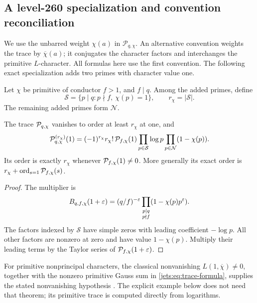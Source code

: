 \subsection{A level-260 specialization and convention reconciliation}
We use the unbarred weight $\chi(a)$ in $\mathcal P_{q,\chi}$.
An alternative convention weights the trace by $\overline\chi(a)$; it
conjugates the character factors and interchanges the primitive $L$-character.
All formulas here use the first convention. The following exact specialization
adds two primes with character value one.



Let $\chi$ be primitive of conductor $f>1$, and $f\mid q$.
Among the added primes, define
\[
\mathcal S=\{p\mid q:p\nmid f,\ \chi(p)=1\},\qquad r_\chi=|\mathcal S|.
\]
The remaining added primes form $\mathcal N$.

\begin{theorem}\label{conductor:thm:twisted}
The trace $\mathcal P_{q,\chi}$ vanishes to order at least $r_\chi$ at one, and
\begin{equation}\label{conductor:eq:twistedlead}
\mathcal P_{q,\chi}^{(r_\chi)}(1)=
(-1)^{r_\chi}r_\chi!\,
\mathcal P_{f,\chi}(1)
\prod_{p\in\mathcal S}\log p
\prod_{p\in\mathcal N}(1-\chi(p)).
\end{equation}
Its order is exactly $r_\chi$ whenever $\mathcal P_{f,\chi}(1)\ne0$.
More generally its exact order is $r_\chi+\operatorname{ord}_{s=1}\mathcal P_{f,\chi}(s)$.
\end{theorem}
\begin{proof}
The multiplier is
\[
B_{q,f,\chi}(1+\varepsilon)=
(q/f)^{-\varepsilon}
\prod_{\substack{p\mid q\\p\nmid f}}(1-\chi(p)p^\varepsilon).
\]
The factors indexed by $\mathcal S$ have simple zeros with leading
coefficient $-\log p$. All other factors are nonzero at zero and have
value $1-\chi(p)$. Multiply their leading terms by the Taylor series
of $\mathcal P_{f,\chi}(1+\varepsilon)$.
\end{proof}

For primitive nonprincipal characters, the classical nonvanishing
$L(1,\overline\chi)\ne0$, together with the nonzero primitive Gauss sum in
\eqref{jets:eq:trace-formula}, supplies the stated nonvanishing hypothesis
\cite{jets:dlmf-dirichlet}. The explicit example below does not need that theorem;
its primitive trace is computed directly from logarithms.

